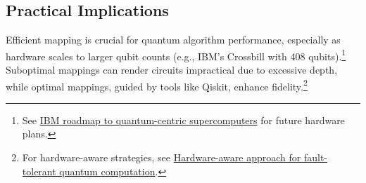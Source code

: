 
\subsection*{Practical Implications}

Efficient mapping is crucial for quantum algorithm performance, especially as
hardware scales to larger qubit counts (e.g., IBM’s Crossbill with 408
qubits).\footnote{See \href{https://www.ibm.com/quantum/blog/ibm-quantum-roadmap-2025}
{IBM roadmap to quantum-centric supercomputers} for future hardware plans.}
Suboptimal mappings can render circuits impractical due to excessive depth,
while optimal mappings, guided by tools like Qiskit, enhance fidelity.\footnote{
  For hardware-aware strategies, see \href{https://www.ibm.com/blogs/research/2020/09/hardware-aware-quantum/}
{Hardware-aware approach for fault-tolerant quantum computation}.}


